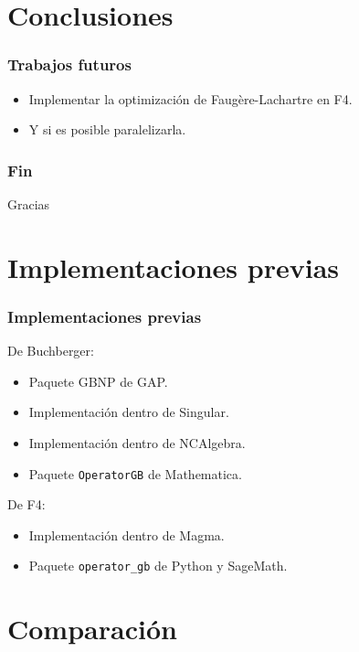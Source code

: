 \documentclass[spanish, aspectratio=169, hidecontrols]{beamer}
\begin{document}
\section{Conclusiones}

\begin{frame}
  \frametitle{Trabajos futuros}
  \begin{itemize}
    \item Implementar la optimización de Faugère-Lachartre en F4.
    \item Y si es posible paralelizarla.
  \end{itemize}
\end{frame}

\appendix

\begin{frame}
  \frametitle{Fin}
  \begin{center}
    \Huge Gracias
  \end{center}
\end{frame}

\appendix

\section{Implementaciones previas}

\begin{frame}
  \frametitle{Implementaciones previas}
  De Buchberger:
  \begin{itemize}
    \item Paquete GBNP de GAP.
    \item Implementación dentro de Singular.
    \item Implementación dentro de NCAlgebra.
    \item Paquete \texttt{OperatorGB} de Mathematica.
  \end{itemize}
  De F4:
  \begin{itemize}
    \item Implementación dentro de Magma.
    \item Paquete \texttt{operator\_gb} de Python y SageMath.
  \end{itemize}
\end{frame}

\section{Comparación}
\end{document}
